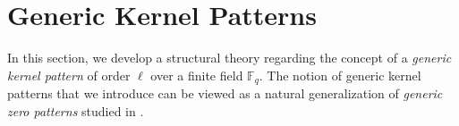 \documentclass[11pt]{article}
\theoremstyle{plain}
\theoremstyle{definition}
\theoremstyle{remark}
\newcommand{\F}{\mathbb{F}}
\newcommand{\bv}{\bm{v}}
\newcommand{\rank}{\mathrm{rank}}
\begin{document}

%
\section{Generic Kernel Patterns}%
In this section, we develop a structural theory regarding the concept of a \emph{generic kernel pattern} of order $\ell$ over a finite field $\mathbb{F}_q$. The notion of generic kernel patterns that we introduce can be viewed as a natural generalization of \emph{generic zero patterns} studied in \cite{dau2014existence, lovett2018mds, yildiz2019optimum, brakensiek2023generic}.
\end{document}
